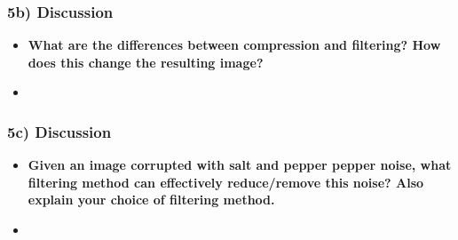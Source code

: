 \documentclass[../report.tex]{subfiles}
\begin{document}
    \begin{frame}[t]
		\frametitle{5b) Discussion}
		
		\begin{normalsize}
			\begin{itemize}
				\setlength\itemsep{1em}\fontsize{6pt}{6pt}
				
				\item[] \textbf{
					What are the differences between compression and filtering? How does this change the resulting image?
				 }

				\item[] {\selectfont\textcolor{blue}{}}

			\end{itemize}
		\end{normalsize}
		
	\end{frame}
	\begin{frame}[t]
		\frametitle{5c) Discussion}
		
		\begin{normalsize}
			\begin{itemize}
				\setlength\itemsep{1em}\fontsize{6pt}{6pt}
				
				\item[] \textbf{
					Given an image corrupted with salt and pepper pepper noise, what filtering method can effectively reduce/remove this noise? Also explain your choice of filtering method. 
				 }

				\item[] {\selectfont\textcolor{blue}{}}

			\end{itemize}
		\end{normalsize}
		
	\end{frame}
\end{document}
